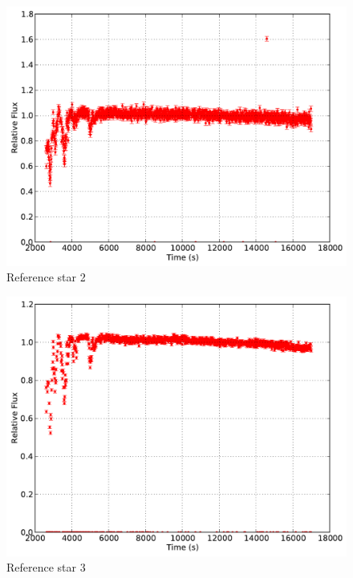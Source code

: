 \documentclass{aastex61}
\begin{document}
\begin{figure}[hbt!]
	\centering
	\includegraphics[scale = .45]{exo_curves2.pdf}
	\caption{Reference star 2}
	\label{fig: refcurve2}
\end{figure}
\begin{figure}[h]
	\centering
	\includegraphics[scale = .45]{exo_curves3.pdf}
	\caption{Reference star 3}
	\label{fig: refcurve3}
\end{figure}
\end{document}

